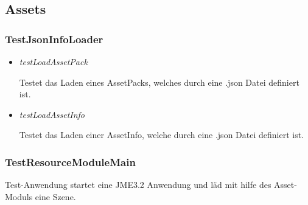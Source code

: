 \subsection{Assets}

\subsubsection{TestJsonInfoLoader}
\begin{itemize}
    \item \textit{testLoadAssetPack}
        \begin{leftbar}[0.9\linewidth]
            Testet das Laden eines AssetPacks, welches durch eine .json Datei definiert ist.
        \end{leftbar}

    \item \textit{testLoadAssetInfo}
        \begin{leftbar}[0.9\linewidth]
            Testet das Laden einer AssetInfo, welche durch eine .json Datei definiert ist.
        \end{leftbar}
\end{itemize}

\subsubsection{TestResourceModuleMain}
Test-Anwendung startet eine JME3.2 Anwendung und läd mit hilfe des Asset-Moduls eine Szene.